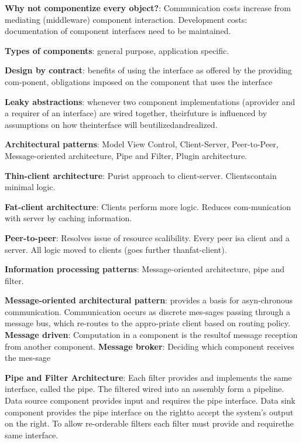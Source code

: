 \documentclass{article}
\begin{document}
\noindent \textbf{Why not componentize every object?}:
Communication costs increase from mediating (middleware) component interaction.
Development costs: documentation of component interfaces need to be maintained.

\noindent \textbf{Types of components}: general purpose, application specific.

\noindent \textbf{Design by contract}: benefits of using the interface as offered by the providing com-ponent, obligations imposed on the component that uses the interface

\noindent \textbf{Leaky abstractions}: whenever two component implementations (aprovider and a requirer of an interface) are wired together, theirfuture is influenced by assumptions on how theinterface will beutilizedandrealized.

\noindent \textbf{Architectural patterns}: Model View Control, Client-Server, Peer-to-Peer, Message-oriented architecture, Pipe and Filter, Plugin architecture.

\noindent \textbf{Thin-client architecture}: Purist approach to client-server. Clientscontain minimal logic.

\noindent \textbf{Fat-client architecture}: Clients perform more logic. Reduces com-munication with server by caching information.

\noindent \textbf{Peer-to-peer}: Resolves issue of resource scalibility. Every peer isa client and a server. All logic moved to clients (goes further thanfat-client).

\noindent \textbf{Information processing patterns}: Message-oriented architecture, pipe and filter.

\noindent \textbf{Message-oriented architectural pattern}: provides a basis for asyn-chronous communication.
Communication occurs as discrete mes-sages passing through a message bus, which re-routes to the appro-priate client based on routing policy.
\noindent \textbf{Message  driven}: Computation in a component is the resultof message reception from another component.
\noindent \textbf{Message broker}: Deciding which component receives the mes-sage

\noindent \textbf{Pipe and Filter Architecture}: Each filter provides and implements the same interface, called the pipe.
The filtered wired into an assembly form a pipeline.
Data source component provides input and requires the pipe interface.
Data sink component provides the pipe interface on the rightto accept the system’s output on the right.
To allow re-orderable filters each filter must provide and requirethe same interface.
\end{document}
